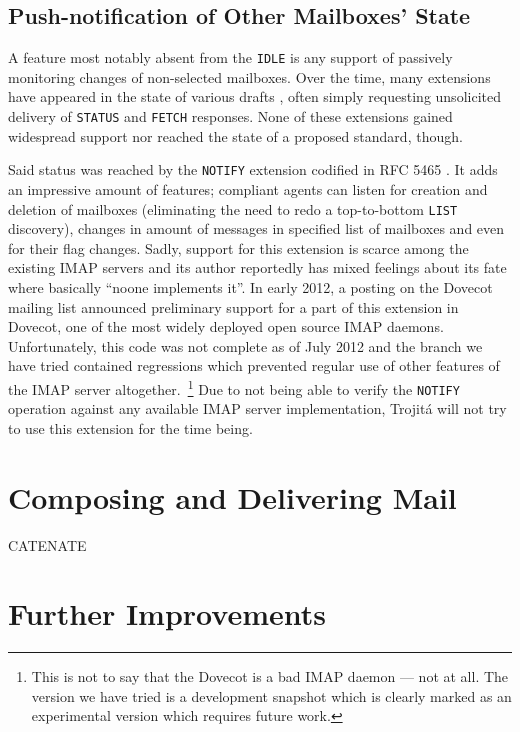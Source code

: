 \documentclass[trojita]{subfiles}
\begin{document}
\subsection{Push-notification of Other Mailboxes' State}

A feature most notably absent from the {\tt IDLE} is any support of passively monitoring changes of non-selected
mailboxes.  Over the time, many extensions have appeared in the state of various drafts
\cite{draft-wener-lemonade-clearidle} \cite{draft-gulbrandsen-imap-nostore} \cite{draft-magicaltux-imap4-idleplus},
often simply requesting unsolicited delivery of {\tt STATUS} and {\tt FETCH} responses.  None of these extensions gained
widespread support nor reached the state of a proposed standard, though.

Said status was reached by the {\tt NOTIFY} extension codified in RFC 5465 \cite{rfc5465}.  It adds an impressive amount
of features; compliant agents can listen for creation and deletion of mailboxes (eliminating the need to redo a
top-to-bottom {\tt LIST} discovery), changes in amount of messages in specified list of mailboxes and even for their
flag changes.  Sadly, support for this extension is scarce among the existing IMAP servers and its author reportedly has
mixed feelings \cite{arnt-good-bad-rfc} about its fate where basically ``noone implements it''.  In early 2012, a
posting on the Dovecot mailing list announced \cite{dovecot-imap-notify} preliminary support for a part of this
extension in Dovecot, one of the most widely deployed open source IMAP daemons.  Unfortunately, this code was not
complete as of July 2012 \cite{dovecot-hg-notify} and the branch we have tried contained regressions which prevented
regular use of other features of the IMAP server altogether.~\footnote{This is not to say that the Dovecot is a bad IMAP
daemon --- not at all.  The version we have tried is a development snapshot which is clearly marked as an experimental
version which requires future work.}  Due to not being able to verify the {\tt NOTIFY} operation against any available
IMAP server implementation, Trojitá will not try to use this extension for the time being.

\section{Composing and Delivering Mail}


CATENATE \cite{rfc4469}

\section{Further Improvements}
\end{document}
